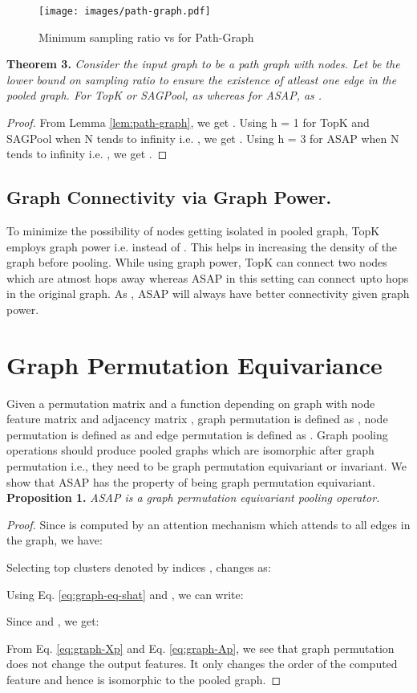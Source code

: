 \documentclass[letterpaper]{article} \usepackage{aaai20}  \usepackage{times}  \usepackage{helvet} \usepackage{courier}  \usepackage[hyphens]{url}  \usepackage{graphicx} \urlstyle{rm} \def\UrlFont{\rm}  \usepackage{graphicx}  \frenchspacing  \setlength{\pdfpagewidth}{8.5in}  \setlength{\pdfpageheight}{11in}
\begin{document}
	
	\begin{figure}[!ht]
	\centering
	\texttt{[image: images/path-graph.pdf]}
	\caption{\label{fig:path-graph} Minimum sampling ratio  vs  for Path-Graph}
	\end{figure}
	
	
\textbf{Theorem 3.}
	\textit{
		Consider the input graph to be a path graph with  nodes. Let  be the lower bound on sampling ratio  to ensure the existence of atleast one edge in the pooled graph. For TopK or SAGPool,   as  whereas for ASAP,  as .
	}
	\begin{proof}
		From Lemma \eqref{lem:path-graph}, we get . Using 	h = 1 for TopK and SAGPool when N tends to infinity i.e. , we get . Using h = 3 for ASAP when N tends to infinity i.e. , we get .
	\end{proof}
	

	
	\subsection{Graph Connectivity via  Graph Power.}
	\label{kth-power}
	To minimize the possibility of nodes getting isolated in pooled graph, TopK employs  graph power i.e.  instead of . This helps in increasing the density of the graph before pooling. While using  graph power, TopK can connect two nodes which are atmost  hops away whereas ASAP in this setting can connect upto  hops in the original graph.  As , ASAP will always have better connectivity given  graph power.
	
	
	\section{Graph Permutation Equivariance}
	\label{ssec:perm-eq-proof}
	
	Given a permutation matrix  and a function  depending on graph with node feature matrix  and adjacency matrix , graph permutation is defined as , node permutation is defined as  and edge permutation is defined as .
	Graph pooling operations should produce pooled graphs which are isomorphic after graph permutation i.e., they need to be graph permutation equivariant or invariant. We show that ASAP has the property of being graph permutation equivariant.\\
	
\textbf{Proposition 1.}
	\textit{ASAP is a graph permutation equivariant pooling operator.}
	\begin{proof}
		Since  is computed by an attention mechanism which attends to all edges in the graph, we have:
		
		Selecting top  clusters denoted by indices , changes  as:
		
		Using Eq. \eqref{eq:graph-eq-shat} and    
		, we can write:
		
		Since  and , we get:
		
		From Eq. \eqref{eq:graph-Xp} and Eq. \eqref{eq:graph-Ap}, we see that graph permutation does not change the output features. It only changes the order of the computed feature and hence is isomorphic to the pooled graph.
	\end{proof}
\end{document}
